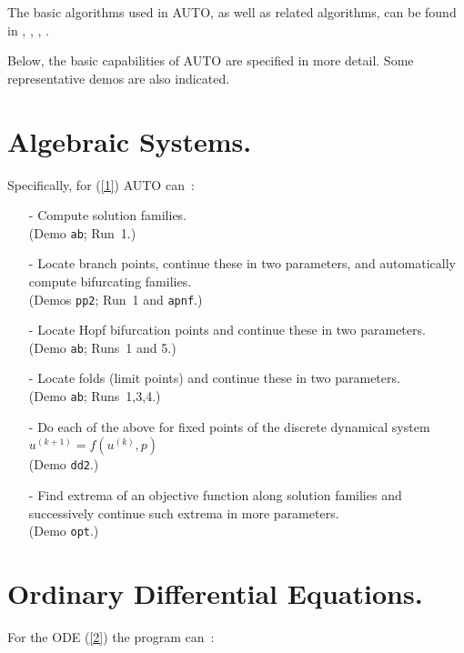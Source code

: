 \documentclass[12pt]{report}
\begin{document}
The basic algorithms used in {\cal AUTO},
as well as related algorithms, can be found in 
 \citeyear{HBK:77},
 \citeyear{HBK:86},
 \citeyear{DoKeKe:91a},
 \citeyear{DoKeKe:91b}.

Below, the basic capabilities of {\cal AUTO} are specified in more detail.
Some representative demos are also indicated.
 
\section{ Algebraic Systems.} \label{sec:algebraic_systems}
Specifically, for (\ref{1}) {\cal AUTO} can~:~
 
\begin{itemize}
\item[-]
  Compute solution families.\\  (Demo {\tt ab}; Run~1.) 
\item[-]
  Locate branch points, continue these in two parameters,
  and automatically compute
  bifurcating families. \\ (Demos {\tt pp2}; Run~1 and {\tt apnf}.)
\item[-]
  Locate Hopf bifurcation points and continue these in two
  parameters. \\ (Demo {\tt ab}; Runs~1 and 5.)
\item[-]
  Locate folds (limit points) and continue these 
  in two parameters. \\(Demo {\tt ab}; Runs~1,3,4.)
\item[-]
  Do each of the above for fixed points
  of the discrete dynamical system 
  $u^{(k+1)}= f( u^{(k)}, p )$ \\ (Demo {\tt dd2}.)
\item[-]
  Find extrema of an objective function along solution families
  and successively continue such extrema in more parameters.
  \\ (Demo {\tt opt}.)
\end{itemize}


\section{ Ordinary Differential Equations.} \label{sec:ODEs}
For the ODE (\ref{2}) the program can~:~
 
\end{document}
